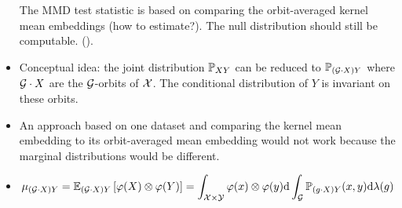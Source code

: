\begin{itemize}
The MMD test statistic is based on comparing the orbit-averaged kernel mean embeddings (\todo how to estimate?). The null distribution should still be computable. (\todo).

\iffalse
From our paired setup, we have empirical distributions $\widehat{\bbP}_X^{(1)}=\widehat{\bbP}_{g'\cdot X}^{(2)}$. We can approximate the joint distributions by
\begin{align*}
\bbP_{XY}^{(1)} &= \bbP_X^{(1)}\bbP_{Y|X}^{(1)} \approx \widehat{\bbP}_X^{(1)}\bbP_{Y|X}^{(1)}\;, \\
\bbP_{(g'\cdot X)Y}^{(2)} &= \bbP_{g'\cdot X}^{(2)}\bbP_{Y|g'\cdot X}^{(2)} \approx \widehat{\bbP}_{g'\cdot X}^{(2)}\bbP_{Y|g'\cdot X}^{(2)}\;.
\end{align*}

Let $\calO$ be the orbit-averaging operator \parencite{Elesedy:2021}
\[
\calO f(x) = \int_\calG f(g\cdot x)\mathrm{d}\lambda(g)\;.
\]
\parencite{Elesedy:2021,Elesedy:2021:equivariant} show that a function $f$ is $\calG$-invariant if and only if $\calO f=f$. We can likely extend this argument to a function $g(x,y)$ with two inputs where $g$ is $\calG$-invariant in one input, i.e., rewriting $g(x,y)=g_y(x)$ and $g_y(x)$ being $\calG$-invariant if and only if $\calO g_y = g_y$. Applying this to distributions, we should have $\bbP_{Y|X}$ is invariant if and only if for all $y\in\calY$,
\[
\bbP_{Y|X}(y|x)=\int_\calG\bbP_{Y|X}(y|g\cdot x)\mathrm{d}\lambda(g)
\]
and so
\[
\bbP_{Y|X}(y|x)\bbP_X(x)=\int_\calG\mathbb{P}_{Y|X}(y|g\cdot x)\bbP_X(x)\mathrm{d}\lambda(g) \;.
\]
\fi

\item
Conceptual idea: the joint distribution $\mathbb{P}_{XY}$ can be reduced to $\mathbb{P}_{(\mathcal{G}\cdot X)Y}$ where $\mathcal{G}\cdot X$ are the $\calG$-orbits of $\mathcal{X}$. The conditional distribution of $Y$ is invariant on these orbits.

\item
An approach based on one dataset and comparing the kernel mean embedding to its orbit-averaged mean embedding would not work because the marginal distributions would be different.

\item
\todo
\[
\mu_{(\mathcal{G}\cdot X)Y} = \mathbb{E}_{(\mathcal{G}\cdot X)Y}\left[\varphi(X)\otimes\varphi(Y)\right] = \int_{\mathcal{X}\times\mathcal{Y}}\varphi(x)\otimes\varphi(y)\mathrm{d}\int_{\mathcal{G}}\mathbb{P}_{(g\cdot X)Y}(x,y)\mathrm{d}\lambda(g)
\]

\end{itemize}

\iffalse
\todo

